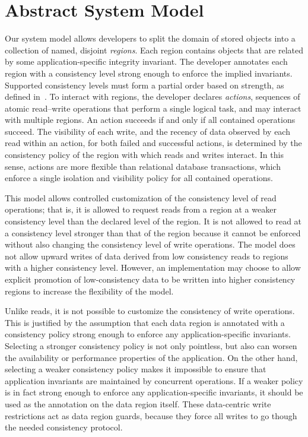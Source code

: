 \documentclass[numbers]{sigplanconf}
\begin{document}
\section{Abstract System Model}
\label{sec:model}
Our system model allows developers to split the domain of stored objects into a
collection of named, disjoint \emph{regions}. Each
region contains objects that are related by some application-specific integrity
invariant. The developer annotates each region with a consistency level 
strong enough to enforce the implied invariants. Supported consistency levels 
must form a partial order based on strength, as defined
in~\cite{sivaramakrishnan2015declarative}. To interact with regions, the developer
declares \emph{actions}, sequences of atomic
read--write operations that perform a single logical task, and may interact with
multiple regions. An action succeeds if and only if all contained operations
succeed. The visibility of each write, and the recency of
data observed by each read within an action, for both failed and successful
actions, is determined by the consistency policy of the region with which reads
and writes interact. In this sense, actions are more flexible than relational
database transactions, which enforce a single isolation and visibility policy for all contained
operations.

This model allows controlled customization of the consistency level of read operations; 
that is, it is allowed to request reads from a region at a weaker consistency level than the declared level of
the region. It is not allowed to read
at a consistency level stronger than that of the region
because it cannot be enforced without also changing the consistency
level of write operations. The model does not allow upward writes of data
derived from low consistency reads to regions with a higher consistency level.
However, an implementation may choose to
allow explicit promotion of low-consistency data to be written into higher
consistency regions to increase the flexibility of the model.

Unlike reads, it is not possible to customize the consistency of write
operations. This is justified
by the assumption that each data region is annotated with a consistency policy strong enough to enforce 
any application-specific invariants. Selecting a stronger
consistency policy is not only pointless, but also can worsen
the availability or performance properties of the application. On the other hand,
selecting a weaker consistency policy makes it impossible to ensure that
application invariants are maintained by concurrent
operations. If a weaker policy is in fact strong enough to enforce any
application-specific
invariants, it should be used as the annotation on the data region itself. 
These data-centric write restrictions act as data region guards, because they force all writes to go
though the needed consistency protocol.
\end{document}
